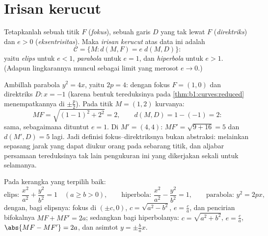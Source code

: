 \section{Irisan kerucut}

\begin{definition}\label{def:b1:curves:conics}
Tetapkanlah sebuah titik $F$ (\emph{fokus}), sebuah garis $D$ yang tak lewat $F$
(\emph{direktriks}) dan $e > 0$ (\emph{eksentrisitas}). Maka
\emph{irisan kerucut} atas data ini adalah
\[
\mathcal{C} = \{M : d(M, F) = e\; d(M, D)\}:
\]
yaitu \emph{elips} untuk $e < 1$, \emph{parabola} untuk $e = 1$, dan
\emph{hiperbola} untuk $e > 1$. (Adapun lingkarannya muncul sebagai limit
yang merosot $e \to 0$.)
\end{definition}

\begin{example}
\label{ex:b1:curves:parabolacheck}
Ambillah parabola $y^2 = 4x$, yaitu $2p = 4$: dengan fokus $F = (1, 0)$
dan direktriks $D : x = -1$ (karena bentuk tereduksinya pada
\cref{thm:b1:curves:reduced} menempatkannya di $\pm\frac p2$). Pada
titik $M = (1, 2)$ kurvanya:
\[
MF = \sqrt{(1-1)^2 + 2^2} = 2,
\qquad
d(M, D) = 1 - (-1) = 2 :
\]
sama, sebagaimana dituntut $e = 1$. Di $M' = (4, 4)$: $MF' = \sqrt{9 +
16} = 5$ dan $d(M', D) = 5$ lagi. Jadi definisi
fokus--direktriksnya bukan abstraksi: melainkan sepasang jarak yang dapat
diukur orang pada sebarang titik, dan aljabar persamaan
tereduksinya tak lain pengukuran ini yang dikerjakan sekali untuk
selamanya.
\end{example}

\begin{theorem}\label{thm:b1:curves:reduced}
Pada kerangka  yang terpilih baik:
\[
\text{elips: } \frac{x^2}{a^2} + \frac{y^2}{b^2} = 1
\quad (a \geq b > 0),
\qquad
\text{hiperbola: } \frac{x^2}{a^2} - \frac{y^2}{b^2} = 1,
\qquad
\text{parabola: } y^2 = 2px,
\]
dengan, bagi elipsnya: fokus di $(\pm c, 0)$, $c = \sqrt{a^2 - b^2}$,
$e = \frac ca$, dan pencirian bifokalnya $MF + MF' = 2a$;
sedangkan bagi hiperbolanya: $c = \sqrt{a^2 + b^2}$, $e = \frac ca$,
$\abs{MF - MF'} = 2a$, dan asimtot $y = \pm\frac ba x$.
\end{theorem}

